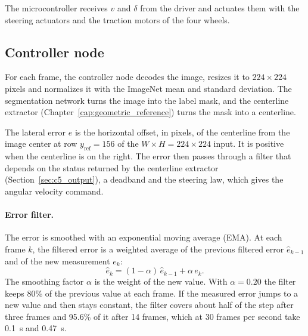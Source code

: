 The microcontroller receives $v$ and $\delta$ from the driver and actuates them with the steering actuators and the traction motors of the four wheels.

\subsection{Controller node}
\label{subsubsec:control_node}

For each frame, the controller node decodes the image, resizes it to $224\times224$ pixels and normalizes it with the ImageNet mean and standard deviation. The segmentation network turns the image into the label mask, and the centerline extractor (Chapter~\ref{cap:geometric_reference}) turns the mask into a centerline.

The lateral error $e$ is the horizontal offset, in pixels, of the centerline from the image center at row $y_{\mathrm{ref}} = 156$ of the $W \times H = 224\times224$ input. It is positive when the centerline is on the right. The error then passes through a filter that depends on the status returned by the centerline extractor (Section~\ref{sec:c5_output}), a deadband and the steering law, which gives the angular velocity command.

\paragraph{Error filter.}
The error is smoothed with an exponential moving average (EMA). At each frame $k$, the filtered error is a weighted average of the previous filtered error $\hat{e}_{k-1}$ and of the new measurement $e_k$:
\begin{equation}
    \hat{e}_k = (1 - \alpha)\, \hat{e}_{k-1} + \alpha \, e_k.
    \label{eq:filter_ema_update}
\end{equation}
The smoothing factor $\alpha$ is the weight of the new value. With $\alpha = 0.20$ the filter keeps 80\% of the previous value at each frame. If the measured error jumps to a new value and then stays constant, the filter covers about half of the step after three frames and 95.6\% of it after 14 frames, which at 30 frames per second take 0.1~s and 0.47~s.

